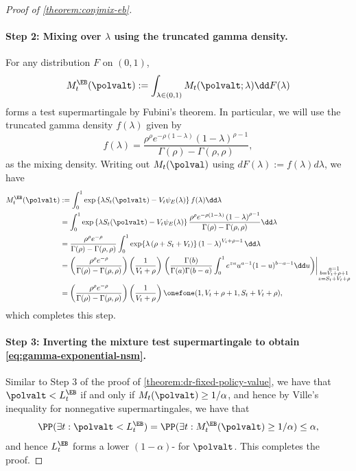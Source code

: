 \begin{proof}[Proof of \cref{theorem:conjmix-eb}]
\paragraph{Step 2: Mixing over $\lambda$ using the truncated gamma density.}
For any distribution $F$ on $(0, 1)$,
\begin{align}
    M_t^\EB(\polvalt) := \int_{\lambda \in (0, 1)} M_t(\polvalt; \lambda) \dd F(\lambda)
\end{align}
forms a test supermartingale by Fubini's theorem. In particular, we will use the truncated gamma density $f(\lambda)$ given by
\begin{equation}
f(\lambda) = \frac{\rho^\rho e^{-\rho \left(1 - \lambda\right)} \left(1 - \lambda\right)^{\rho - 1}}{\Gamma(\rho) - \Gamma(\rho, \rho)}, 
\end{equation}
as the mixing density. Writing out $M_t(\polval)$ using $dF(\lambda) := f(\lambda)d\lambda$, we have 
\begin{align*}
M_t^\EB(\polvalt) &:= \int_0^1 \exp \left \{ \lambda S_t(\polvalt) - V_t \psi_E(\lambda) \right \} f(\lambda) \dd\lambda \\
&=\int_0^1 \exp \left \{ \lambda S_t(\polvalt) - V_t \psi_E(\lambda) \right \} \frac{\rho^\rho e^{-\rho \left(1 - \lambda\right)} \left(1 - \lambda\right)^{\rho - 1}}{\Gamma(\rho) - \Gamma(\rho, \rho)} \dd\lambda \\
&= \frac{\rho^\rho e^{-\rho}}{\Gamma(\rho) - \Gamma(\rho, \rho)} \int_0^1 \exp \{{\lambda \left(\rho + S_t + V_t\right)}\} \left(1 - \lambda\right)^{V_t + \rho - 1} \dd\lambda \\
&= \left(\frac{\rho^\rho e^{-\rho}}{\Gamma(\rho) - \Gamma(\rho, \rho)}\right) \left(\frac{1}{V_t + \rho}\right) \left.\left(  \frac{\Gamma(b)}{\Gamma(a) \Gamma(b-a)} \int_0^1 e^{z u} u^{a-1} (1 - u)^{b - a - 1} \dd u \right)\right|_{\substack{a = 1 \\ b = V_t + \rho + 1 \\ z = S_t + V_t + \rho }} \\
&= \left(\frac{\rho^\rho e^{-\rho}}{\Gamma(\rho) - \Gamma(\rho, \rho)}\right) \left(\frac{1}{V_t + \rho}\right) \onefone(1, V_t + \rho + 1, S_t + V_t + \rho),
\end{align*}
which completes this step.

\paragraph{Step 3: Inverting the mixture test supermartingale to obtain \eqref{eq:gamma-exponential-nsm}.}
Similar to Step 3 of the proof of \cref{theorem:dr-fixed-policy-value}, we have that $\polvalt < L_t^\EB$ if and only if $M_t(\polvalt) \geq 1/\alpha$, and hence by Ville's inequality for nonnegative supermartingales, we have that
\begin{equation*}
    \PP(\exists t : \polvalt < L_t^\EB) = \PP(\exists t : M_t^\EB(\polvalt) \geq 1/\alpha) \leq \alpha,
\end{equation*}
and hence $L_t^\EB$ forms a lower $(1-\alpha)$-\cs{} for $\polvalt$. This completes the proof.
\end{proof}


